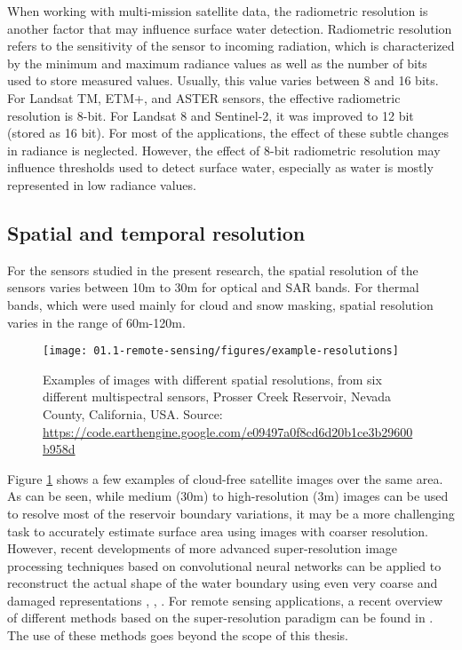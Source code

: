 When working with multi-mission satellite data, the radiometric resolution is another factor that may influence surface water detection. Radiometric resolution refers to the sensitivity of the sensor to incoming radiation, which is characterized by the minimum and maximum radiance values as well as the number of bits used to store measured values. Usually, this value varies between 8 and 16 bits. For Landsat TM, ETM+, and ASTER sensors, the effective radiometric resolution is 8-bit. For Landsat 8 and Sentinel-2, it was improved to 12 bit (stored as 16 bit). For most of the applications, the effect of these subtle changes in radiance is neglected. However, the effect of 8-bit radiometric resolution may influence thresholds used to detect surface water, especially as water is mostly represented in low radiance values.

\subsection{Spatial and temporal resolution}
For the sensors studied in the present research, the spatial resolution of the sensors varies between 10m to 30m for optical and SAR bands. For thermal bands, which were used mainly for cloud and snow masking, spatial resolution varies in the range of 60m-120m. 

\begin{figure}
	\texttt{[image: 01.1-remote-sensing/figures/example-resolutions]}
	\caption{Examples of images with different spatial resolutions, from six different multispectral sensors, Prosser Creek Reservoir, Nevada County, California, USA. Source: \url{https://code.earthengine.google.com/e09497a0f8cd6d20b1ce3b29600b958d}}
	\label{fig:example-resolutions}
\end{figure}

Figure \ref{fig:example-resolutions} shows a few examples of cloud-free satellite images over the same area. As can be seen, while medium (30m) to high-resolution (3m) images can be used to resolve most of the reservoir boundary variations, it may be a more challenging task to accurately estimate surface area using images with coarser resolution. However, recent developments of more advanced super-resolution image processing techniques based on convolutional neural networks can be applied to reconstruct the actual shape of the water boundary using even very coarse and damaged representations \citep{ledig2016photo}, \citep{shi2016real}, \citep{johnson2016perceptual}. For remote sensing applications, a recent overview of different methods based on the super-resolution paradigm can be found in \citep{garzelli2016review}. The use of these methods goes beyond the scope of this thesis.

